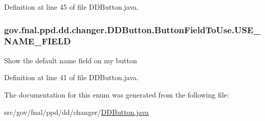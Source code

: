 Definition at line 45 of file D\-D\-Button.\-java.

\hypertarget{enumgov_1_1fnal_1_1ppd_1_1dd_1_1changer_1_1DDButton_1_1ButtonFieldToUse_a68754ca17fd3e4649184763d72308b13}{
\subsubsection[{U\-S\-E\-\_\-\-N\-A\-M\-E\-\_\-\-F\-I\-E\-L\-D}]{\setlength{\rightskip}{0pt plus 5cm}gov.\-fnal.\-ppd.\-dd.\-changer.\-D\-D\-Button.\-Button\-Field\-To\-Use.\-U\-S\-E\-\_\-\-N\-A\-M\-E\-\_\-\-F\-I\-E\-L\-D}}\label{enumgov_1_1fnal_1_1ppd_1_1dd_1_1changer_1_1DDButton_1_1ButtonFieldToUse_a68754ca17fd3e4649184763d72308b13}
Show the default name field on my button 

Definition at line 41 of file D\-D\-Button.\-java.



The documentation for this enum was generated from the following file\-:\begin{DoxyCompactItemize}
\item 
src/gov/fnal/ppd/dd/changer/\hyperlink{DDButton_8java}{D\-D\-Button.\-java}\end{DoxyCompactItemize}
